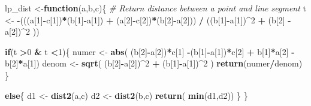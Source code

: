 \documentclass[]{article}
\newenvironment{Shaded}{\begin{snugshade}}{\end{snugshade}}
\newcommand{\KeywordTok}[1]{\textcolor[rgb]{0.13,0.29,0.53}{\textbf{#1}}}
\newcommand{\DecValTok}[1]{\textcolor[rgb]{0.00,0.00,0.81}{#1}}
\newcommand{\StringTok}[1]{\textcolor[rgb]{0.31,0.60,0.02}{#1}}
\newcommand{\CommentTok}[1]{\textcolor[rgb]{0.56,0.35,0.01}{\textit{#1}}}
\newcommand{\ControlFlowTok}[1]{\textcolor[rgb]{0.13,0.29,0.53}{\textbf{#1}}}
\newcommand{\OperatorTok}[1]{\textcolor[rgb]{0.81,0.36,0.00}{\textbf{#1}}}
\newcommand{\NormalTok}[1]{#1}
\begin{document}
\begin{Shaded}
\begin{Highlighting}[]
{\NormalTok{     lp_dist <-}\ControlFlowTok{function}\NormalTok{(a,b,c)\{ }
                               \CommentTok{# Return distance between a point and line segment }
\NormalTok{                               t <-}\StringTok{ }\OperatorTok{-}\NormalTok{(((a[}\DecValTok{1}\NormalTok{]}\OperatorTok{-}\NormalTok{c[}\DecValTok{1}\NormalTok{])}\OperatorTok{*}\NormalTok{(b[}\DecValTok{1}\NormalTok{]}\OperatorTok{-}\NormalTok{a[}\DecValTok{1}\NormalTok{]) }\OperatorTok{+}\StringTok{ }\NormalTok{(a[}\DecValTok{2}\NormalTok{]}\OperatorTok{-}\NormalTok{c[}\DecValTok{2}\NormalTok{])}\OperatorTok{*}\NormalTok{(b[}\DecValTok{2}\NormalTok{]}\OperatorTok{-}\NormalTok{a[}\DecValTok{2}\NormalTok{])) }\OperatorTok{/}\StringTok{ }\NormalTok{((b[}\DecValTok{1}\NormalTok{]}\OperatorTok{-}\NormalTok{a[}\DecValTok{1}\NormalTok{])}\OperatorTok{^}\DecValTok{2} \OperatorTok{+}\StringTok{ }\NormalTok{(b[}\DecValTok{2}\NormalTok{] }\OperatorTok{-}\StringTok{ }\NormalTok{a[}\DecValTok{2}\NormalTok{])}\OperatorTok{^}\DecValTok{2}\NormalTok{ ))}
    
                               \ControlFlowTok{if}\NormalTok{(t }\OperatorTok{>}\DecValTok{0} \OperatorTok{&}\StringTok{ }\NormalTok{t }\OperatorTok{<}\DecValTok{1}\NormalTok{)\{    }
\NormalTok{                                numer <-}\StringTok{ }\KeywordTok{abs}\NormalTok{(  (b[}\DecValTok{2}\NormalTok{]}\OperatorTok{-}\NormalTok{a[}\DecValTok{2}\NormalTok{])}\OperatorTok{*}\NormalTok{c[}\DecValTok{1}\NormalTok{] }\OperatorTok{-}\NormalTok{(b[}\DecValTok{1}\NormalTok{]}\OperatorTok{-}\NormalTok{a[}\DecValTok{1}\NormalTok{])}\OperatorTok{*}\NormalTok{c[}\DecValTok{2}\NormalTok{] }\OperatorTok{+}\StringTok{ }\NormalTok{b[}\DecValTok{1}\NormalTok{]}\OperatorTok{*}\NormalTok{a[}\DecValTok{2}\NormalTok{] }\OperatorTok{-}\StringTok{ }\NormalTok{b[}\DecValTok{2}\NormalTok{]}\OperatorTok{*}\NormalTok{a[}\DecValTok{1}\NormalTok{])}
\NormalTok{                                denom <-}\StringTok{ }\KeywordTok{sqrt}\NormalTok{( (b[}\DecValTok{2}\NormalTok{]}\OperatorTok{-}\NormalTok{a[}\DecValTok{2}\NormalTok{])}\OperatorTok{^}\DecValTok{2}   \OperatorTok{+}\StringTok{ }\NormalTok{(b[}\DecValTok{1}\NormalTok{]}\OperatorTok{-}\NormalTok{a[}\DecValTok{1}\NormalTok{])}\OperatorTok{^}\DecValTok{2}\NormalTok{ ) }
                                \KeywordTok{return}\NormalTok{(numer}\OperatorTok{/}\NormalTok{denom)  }
\NormalTok{                                 \}}
    
                               \ControlFlowTok{else}\NormalTok{\{}
\NormalTok{                                d1 <-}\StringTok{ }\KeywordTok{dist2}\NormalTok{(a,c)}
\NormalTok{                                d2 <-}\StringTok{ }\KeywordTok{dist2}\NormalTok{(b,c)   }
                                \KeywordTok{return}\NormalTok{( }\KeywordTok{min}\NormalTok{(d1,d2))                              }
\NormalTok{                                 \}                                                }
\NormalTok{                               \}}
    
}
\end{Highlighting}
\end{Shaded}
\end{document}
